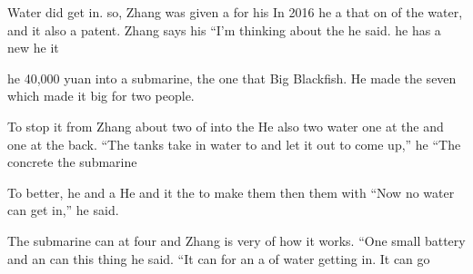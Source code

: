 \begin{lessonbody}
Water did get in.  so, Zhang was given a   for his  In 2016 he  a  that  on  of the water, and it also  a patent. Zhang says his    “I’m  thinking about the  he said.  he has a new  he  it  

 he  40,000 yuan into a  submarine, the one that   Big Blackfish. He made the   seven   which made it big  for two people.

To stop it from  Zhang  about two  of  into the  He also  two water  one at the  and one at the back. “The tanks take in water to  and let it out to come up,” he  “The concrete  the submarine 

To  better, he        and    a  He    and  it  the  to make them  then   them with   “Now no water can get in,” he said.

The submarine can  at four  and Zhang is very  of how  it works. “One small battery and an  can  this  thing  he said. “It can   for  an   a   of water getting in. It can  go 


\end{lessonbody}
